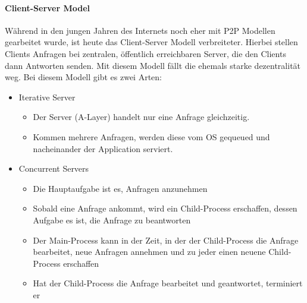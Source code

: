 	\paragraph{Client-Server Model}
		Während in den jungen Jahren des Internets noch eher mit P2P Modellen gearbeitet wurde, ist heute das Client-Server Modell verbreiteter. Hierbei stellen Clients Anfragen bei zentralen, öffentlich erreichbaren Server, die den Clients dann Antworten senden. Mit diesem Modell fällt die ehemals starke dezentralität weg. Bei diesem Modell gibt es zwei Arten:
		\begin{itemize}
			\item Iterative Server
				\begin{itemize}
					\item Der Server (A-Layer) handelt nur eine Anfrage gleichzeitig.
					\item Kommen mehrere Anfragen, werden diese vom OS gequeued und nacheinander der Application serviert.
				\end{itemize}
			\item Concurrent Servers
				\begin{itemize}
					\item Die Hauptaufgabe ist es, Anfragen anzunehmen
					\item Sobald eine Anfrage ankommt, wird ein Child-Process erschaffen, dessen Aufgabe es ist, die Anfrage zu beantworten
					\item Der Main-Process kann in der Zeit, in der der Child-Process die Anfrage bearbeitet, neue Anfragen annehmen und zu jeder einen neuene Child-Process erschaffen
					\item Hat der Child-Process die Anfrage bearbeitet und geantwortet, terminiert er
				\end{itemize}
		\end{itemize}

